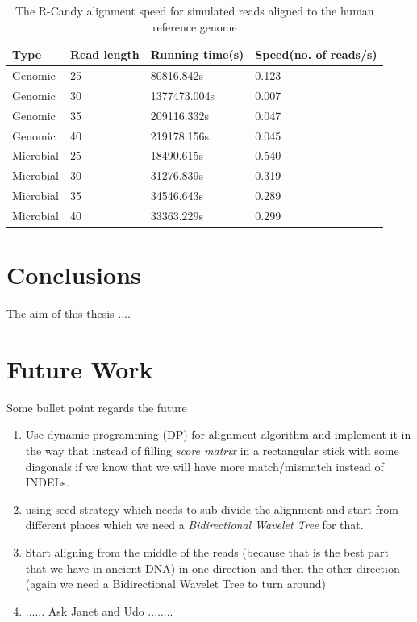 \documentclass[11pt,a4paper]{report}
\begin{document}
\begin{table}[h]
  \begin{tabular}{ |  p{2cm} | p{2cm} | p{3cm} | p{3cm} | }
    \hline
  	\textbf{Type} & \textbf{Read length } &\textbf{Running time(s) } &\textbf
     {Speed\hspace{35pt}(no. of reads/s)} \\ \hline 
  
      Genomic   & 25  & 80816.842s   & 0.123 \\ \hline
      Genomic   & 30  & 1377473.004s & 0.007 \\ \hline
 	  Genomic	& 35  & 209116.332s  & 0.047 \\ \hline
 	  Genomic	& 40  & 219178.156s  & 0.045 \\ \hline
 	  Microbial & 25  & 18490.615s   & 0.540 \\ \hline
      Microbial & 30  & 31276.839s   & 0.319 \\ \hline
 	  Microbial & 35  & 34546.643s   & 0.289 \\ \hline
 	  Microbial & 40  & 33363.229s   & 0.299 \\ \hline
 	  
   \end{tabular}
\caption{The R-Candy alignment speed for simulated reads aligned to the human reference genome}
\label{speed-RG}
\end{table}




\section{Conclusions}
The aim of this thesis ....

\section{Future Work}
Some bullet point regards the future
\begin{enumerate}
\item Use dynamic programming (DP) for alignment algorithm and implement it in 
the way that instead of filling \emph{score matrix} in a rectangular stick with 
some diagonals if we know that we will have more match/mismatch instead of INDELs.
\item using seed strategy which needs to sub-divide the alignment and start from 
different places which we need a \emph{Bidirectional Wavelet Tree}\cite{bidirectional} 
for that.
\item Start aligning from the middle of the reads (because that is the best part 
that we have in ancient DNA) in one direction and then the other direction (again 
we need a Bidirectional Wavelet Tree to turn around)
\item ...... Ask Janet and Udo ........
\end{enumerate}
\end{document}
